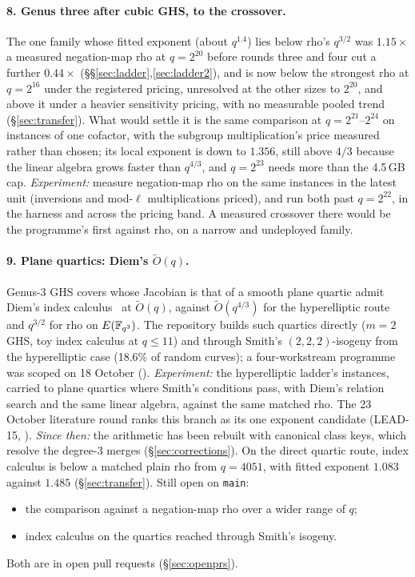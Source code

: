 \paragraph{8. Genus three after cubic GHS, to the crossover.} The one
family whose fitted exponent (about $q^{1.4}$) lies below rho's $q^{3/2}$ was
$1.15\times$ a measured negation-map rho at $q=2^{20}$ before rounds three
and four cut a further $0.44\times$ (\S\S\ref{sec:ladder},\ref{sec:ladder2}),
and is now below the strongest rho at $q=2^{16}$ under the registered
pricing, unresolved at the other sizes to $2^{20}$, and above it under a
heavier sensitivity pricing, with no measurable pooled trend
(\S\ref{sec:transfer}). What would settle it is the same comparison at
$q=2^{21}$--$2^{24}$ on instances of one cofactor, with the subgroup
multiplication's price measured rather than chosen;
its local exponent is down to $1.356$, still above $4/3$ because the linear
algebra grows faster than $q^{4/3}$, and $q=2^{23}$ needs more than the
4.5\,GB cap.
\emph{Experiment:} measure negation-map rho on the same instances in the
latest unit (inversions and mod-$\ell$ multiplications priced), and run
both past $q=2^{22}$, in the harness and across the pricing band. A measured
crossover there would be the programme's first  against rho,
on a narrow and undeployed family.

\paragraph{9. Plane quartics: Diem's $\tilde O(q)$.} Genus-3 GHS covers whose
Jacobian is that of a smooth plane quartic admit Diem's index
calculus~\cite{diem2006,dt2008} at $\tilde O(q)$, against $\tilde O(q^{4/3})$ for
the hyperelliptic route and $q^{3/2}$ for rho on $E(\mathbb{F}_{q^3})$. The
repository builds such quartics directly ($m=2$ GHS, toy index calculus at
$q\le11$) and through Smith's $(2,2,2)$-isogeny from the hyperelliptic case
(18.6\% of random curves); a four-workstream programme was scoped on 18
October ().
\emph{Experiment:} the hyperelliptic ladder's instances, carried to plane
quartics where Smith's conditions pass, with Diem's relation search and the
same linear algebra, against the same matched rho. The 23 October literature
round ranks this branch as its one exponent candidate (LEAD-15,
).
\emph{Since then:} the arithmetic has been rebuilt with canonical class keys,
which resolve the degree-3 merges (\S\ref{sec:corrections}). On the direct
quartic route, index calculus is below a matched plain rho from $q=4051$,
with fitted exponent $1.083$ against $1.485$ (\S\ref{sec:transfer}). Still
open on \texttt{main}:
\begin{itemize}
  \item the comparison against a negation-map rho over a wider range of $q$;
  \item index calculus on the quartics reached through Smith's isogeny.
\end{itemize}
Both are in open pull requests (\S\ref{sec:openprs}).

